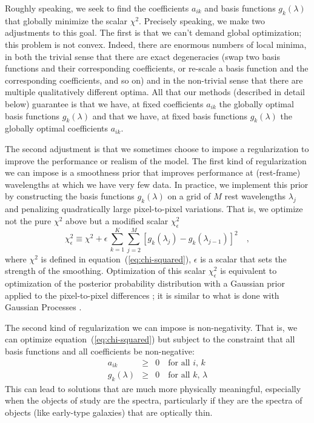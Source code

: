 \documentclass[12pt,preprint]{aastex}
\newcommand{\equationname}{equation}
\begin{document}
Roughly speaking, we seek to find the coefficients $a_{ik}$ and basis
functions $g_k(\lambda)$ that globally minimize the scalar $\chi^2$.
Precisely speaking, we make two adjustments to this goal. The first is
that we can't demand global optimization; this problem is not convex.
Indeed, there are enormous numbers of local minima, in both the
trivial sense that there are exact degeneracies (swap two basis
functions and their corresponding coefficients, or re-scale a basis
function and the corresponding coefficients, and so on) and in the
non-trivial sense that there are multiple qualitatively different
optima. All that our methods (described in detail below) guarantee is
that we have, at fixed coefficients $a_{ik}$ the globally optimal
basis functions $g_k(\lambda)$ and that we have, at fixed basis
functions $g_k(\lambda)$ the globally optimal coefficients $a_{ik}$.

The second adjustment is that we sometimes choose to impose a
regularization to improve the performance or realism of the model.
The first kind of regularization we can impose is a smoothness prior
that improves performance at (rest-frame) wavelengths at which we have
very few data. In practice, we implement this prior by constructing
the basis functions $g_k(\lambda)$ on a grid of $M$ rest
wavelengths $\lambda_j$ and penalizing quadratically large
pixel-to-pixel variations. That is, we optimize not the pure $\chi^2$
above but a modified scalar $\chi_{\epsilon}^2$
\begin{equation}\label{eq:smoothness}
\chi_{\epsilon}^2 \equiv \chi^2
 + \epsilon\,\sum_{k=1}^K \sum_{j=2}^{M}
 \left[g_k(\lambda_{j})-g_k(\lambda_{j-1})\right]^2
\quad ,
\end{equation}
where $\chi^2$ is defined in \equationname~(\ref{eq:chi-squared}),
$\epsilon$ is a scalar that sets the strength of the
smoothing. Optimization of this scalar $\chi_{\epsilon}^2$ is
equivalent to optimization of the posterior probability distribution
with a Gaussian prior applied to the pixel-to-pixel differences
\citep[for example,][]{smoothness}; it is similar to what is done
with Gaussian Processes \citep[for example,][]{Rasmussen06a}.

The second kind of regularization we can impose is non-negativity.
That is, we can optimize \equationname~(\ref{eq:chi-squared}) but subject
to the constraint that all basis functions and all coefficients be
non-negative:
\begin{eqnarray}\label{eq:non-negative}\displaystyle
a_{ik} & \geq & 0 \quad\mbox{for all $i$, $k$} \nonumber\\
g_{k}(\lambda) & \geq & 0 \quad\mbox{for all $k$, $\lambda$}
\end{eqnarray}
This can lead to solutions that are much more physically meaningful,
especially when the objects of study are the spectra, particularly if
they are the spectra of objects (like early-type galaxies) that are
optically thin.
\end{document}

